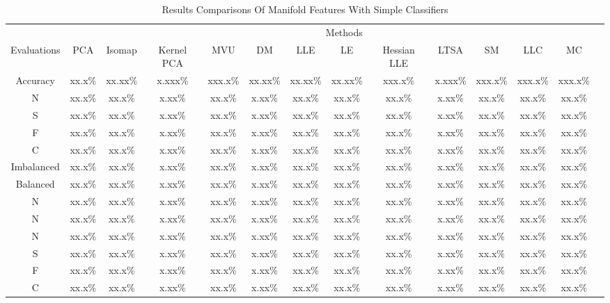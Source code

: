 \documentclass[journal]{IEEEtran}
\begin{document}
\begin{table}[!htbp]
\begin{center}
\begin{threeparttable}
\caption{Results Comparisons Of Manifold Features With Simple Classifiers}
\begin{tabular}{cccccccccccccc}
\hline
\multicolumn{8}{r}{Methods} \\
\cline{2-13}
 Evaluations & PCA &  Isomap      &  Kernel PCA   &   MVU       &  DM  &  LLE  & LE & Hessian LLE  & LTSA  &  SM   &  LLC   & MC\\
\hline
 Accuracy & xx.x\% &  xx.xx\%  &  x.xxx\%   & xxx.x\%    &  xx.xx\%  & xx.xx\%& xx.xx\% &xxx.x\%&  x.xxx\%& xxx.x\%&xxx.x\%&xxx.x\% \\
 N & xx.x\% &  xx.x\%  &  x.xx\%   & xx.x\%    &  x.xx\%  & xx.x\%& xx.x\% &xx.x\%&  x.xx\%& xx.x\%&xx.x\%&xx.x\% \\
 S & xx.x\% &  xx.x\%  &  x.xx\%   & xx.x\%    &  x.xx\%  & xx.x\%& xx.x\% &xx.x\%&  x.xx\%& xx.x\%&xx.x\%&xx.x\% \\
 F & xx.x\% &  xx.x\%  &  x.xx\%   & xx.x\%    &  x.xx\%  & xx.x\%& xx.x\% &xx.x\%&  x.xx\%& xx.x\%&xx.x\%&xx.x\% \\
 C & xx.x\% &  xx.x\%  &  x.xx\%   & xx.x\%    &  x.xx\%  & xx.x\%& xx.x\% &xx.x\%&  x.xx\%& xx.x\%&xx.x\%&xx.x\% \\
 Imbalanced & xx.x\% &  xx.x\%  &  x.xx\%   & xx.x\%    &  x.xx\%  & xx.x\%& xx.x\% &xx.x\%&  x.xx\%& xx.x\%&xx.x\%&xx.x\% \\
  Balanced & xx.x\% &  xx.x\%  &  x.xx\%   & xx.x\%    &  x.xx\%  & xx.x\%& xx.x\% &xx.x\%&  x.xx\%& xx.x\%&xx.x\%&xx.x\% \\
        N & xx.x\% &  xx.x\%  &  x.xx\%   & xx.x\%    &  x.xx\%  & xx.x\%& xx.x\% &xx.x\%&  x.xx\%& xx.x\%&xx.x\%&xx.x\% \\
         N & xx.x\% &  xx.x\%  &  x.xx\%   & xx.x\%    &  x.xx\%  & xx.x\%& xx.x\% &xx.x\%&  x.xx\%& xx.x\%&xx.x\%&xx.x\% \\
          N & xx.x\% &  xx.x\%  &  x.xx\%   & xx.x\%    &  x.xx\%  & xx.x\%& xx.x\% &xx.x\%&  x.xx\%& xx.x\%&xx.x\%&xx.x\% \\
          S & xx.x\% &  xx.x\%  &  x.xx\%   & xx.x\%    &  x.xx\%  & xx.x\%& xx.x\% &xx.x\%&  x.xx\%& xx.x\%&xx.x\%&xx.x\% \\
 F & xx.x\% &  xx.x\%  &  x.xx\%   & xx.x\%    &  x.xx\%  & xx.x\%& xx.x\% &xx.x\%&  x.xx\%& xx.x\%&xx.x\%&xx.x\% \\
 C & xx.x\% &  xx.x\%  &  x.xx\%   & xx.x\%    &  x.xx\%  & xx.x\%& xx.x\% &xx.x\%&  x.xx\%& xx.x\%&xx.x\%&xx.x\% \\

\end{tabular}
\end{threeparttable}
\end{center}
\end{table}
\end{document}
